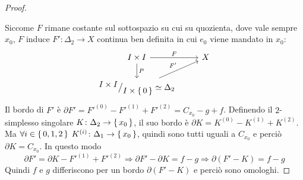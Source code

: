 \begin{proof}
\begin{figure}[htb]
\begin{subfigure}[t]{1.0\linewidth}
      \label{fig:lez3:homotopy_f_g_to_triangle}
    \end{subfigure}
  \end{figure}
  Siccome $ F $ rimane costante sul sottospazio su cui su quozienta, dove vale
  sempre $ x_0 $, $ F $ induce $ F' \colon \Delta_2 \to X $ continua ben definita in cui
  $ e_0 $ viene mandato in $ x_0 $:
  \[
    \begin{tikzcd}
      I \times I \arrow{r}{F} \arrow{d}{P} & X \\
      \quot{I \times I}{I \times \set{0}} \simeq \Delta_2 \arrow{ur}{F'}
    \end{tikzcd}
  \]
  Il bordo di $ F' $ è
  $ \partial F' = F'^{(0)} - F'^{(1)} + F'^{(2)} = C_{x_0} - g + f $. Definendo il
  $ 2 $-simplesso singolare $ K \colon \Delta_2 \to \set{x_0} $, il suo bordo è
  $ \partial K = K^{(0)} - K^{(1)} + K^{(2)} $. Ma $ \forall i \in \set{0,1,2} $
  $ K^{(i)} \colon \Delta_1 \to \set{x_0} $, quindi sono tutti uguali a $ C_{x_0} $
  e perciò $ \partial K = C_{x_0} $. In questo modo
    \[
    \partial F' = \partial K - F'^{(1)} + F'^{(2)} \Rightarrow \partial F' - \partial K = f - g \Rightarrow \partial(F' - K) = f - g
  \]
  Quindi $ f $ e $ g $ differiscono per un bordo $ \partial (F' - K) $ e perciò
  sono omologhi.
\end{proof}

